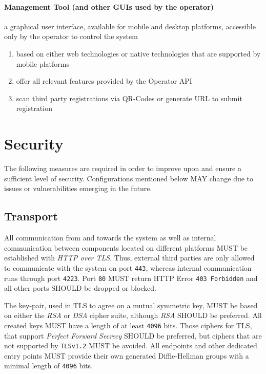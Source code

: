 \documentclass[12pt,english,a4paper,titlepage,cleardoublepage=empty,dottedtoc]{report}
\providecommand{\tightlist}{%
  \setlength{\itemsep}{0pt}\setlength{\parskip}{0pt}}
\begin{document}
\paragraph{Management Tool (and other GUIs used by the
operator)}\label{management-tool-and-other-guis-used-by-the-operator}

a graphical user interface, available for mobile and desktop platforms,
accessible only by the operator to control the system

\begin{enumerate}
\def\labelenumi{\alph{enumi})}
\tightlist
\item
  based on either web technologies or native technologies that are
  supported by mobile platforms
\item
  offer all relevant features provided by the Operator API
\item
  scan third party registrations via QR-Codes or generate URL to submit
  registration
\end{enumerate}

\section{Security}\label{security}

The following measures are required in order to improve upon and ensure
a sufficient level of security. Configurations mentioned below MAY
change due to issues or vulnerabilities emerging in the future.

\subsection{Transport}\label{transport}

All communication from and towards the system as well as internal
communication between components located on different platforms MUST be
established with \emph{HTTP over TLS}. Thus, external third parties are
only allowed to communicate with the system on port \texttt{443},
whereas internal communication runs through port \texttt{4223}. Port
\texttt{80} MUST return HTTP Error \texttt{403\ Forbidden} and all other
ports SHOULD be dropped or blocked.

The key-pair, used in TLS to agree on a mutual symmetric key, MUST be
based on either the \emph{RSA} or \emph{DSA} cipher suite, although
\emph{RSA} SHOULD be preferred. All created keys MUST have a length of
at least \texttt{4096} bits. Those ciphers for TLS, that support
\emph{Perfect Forward Secrecy} SHOULD be preferred, but ciphers that are
not supported by \texttt{TLSv1.2} MUST be avoided. All endpoints and
other dedicated entry points MUST provide their own generated
Diffie-Hellman groups with a minimal length of \texttt{4096} bits.
\end{document}
